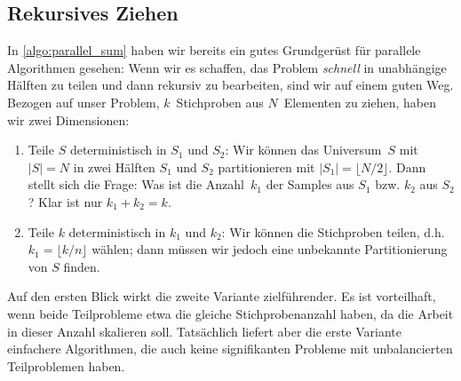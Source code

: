 \subsection{Rekursives Ziehen}
In \cref{algo:parallel_sum} haben wir bereits ein gutes Grundgerüst für parallele Algorithmen gesehen:
Wenn wir es schaffen, das Problem \emph{schnell} in unabhängige Hälften zu teilen und dann rekursiv zu bearbeiten, sind wir auf einem guten Weg.
Bezogen auf unser Problem, $k$~Stichproben aus $N$~Elementen zu ziehen, haben wir zwei Dimensionen:
\begin{enumerate}
    \item Teile $S$ deterministisch in $S_1$ und $S_2$: Wir können das Universum~$S$ mit $|S| = N$ in zwei Hälften $S_1$ und $S_2$ partitionieren mit $|S_1| = \lfloor N / 2 \rfloor$.
          Dann stellt sich die Frage: Was ist die Anzahl~$k_1$ der Samples aus $S_1$ bzw. $k_2$ aus $S_2$? Klar ist nur $k_1 + k_2 = k$.

    \item Teile $k$ deterministisch in $k_1$ und $k_2$: Wir können die Stichproben teilen, d.h. $k_1 = \lfloor k/n \rfloor$ wählen; dann müssen wir jedoch eine unbekannte Partitionierung von $S$ finden.
\end{enumerate}

Auf den ersten Blick wirkt die zweite Variante zielführender.
Es ist vorteilhaft, wenn beide Teilprobleme etwa die gleiche Stichprobenanzahl haben, da die Arbeit in dieser Anzahl skalieren soll.
Tatsächlich liefert aber die erste Variante einfachere Algorithmen, die auch keine signifikanten Probleme mit unbalancierten Teilproblemen haben.

